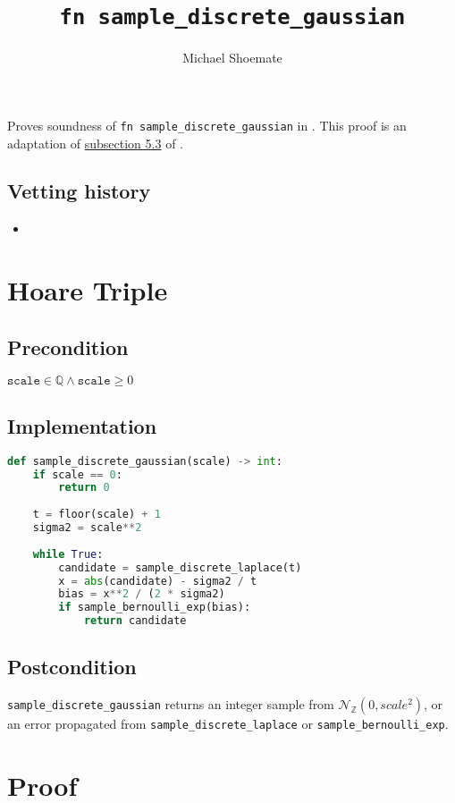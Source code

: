 \documentclass{article}
\title{\texttt{fn sample\_discrete\_gaussian}}
\author{Michael Shoemate}
\begin{document}
\maketitle

\contrib
Proves soundness of \texttt{fn sample\_discrete\_gaussian} in .
This proof is an adaptation of \href{https://arxiv.org/pdf/2004.00010.pdf#subsection.5.3}{subsection 5.3} of \cite{CKS20}.

\subsection*{Vetting history}
\begin{itemize}
    \item {}
\end{itemize}

\section{Hoare Triple}
\subsection*{Precondition}
$\texttt{scale} \in \mathbb{Q} \land \texttt{scale} \geq 0$

\subsection*{Implementation}        
\begin{lstlisting}[language=Python]
def sample_discrete_gaussian(scale) -> int:
    if scale == 0:
        return 0
    
    t = floor(scale) + 1
    sigma2 = scale**2
    
    while True:
        candidate = sample_discrete_laplace(t)
        x = abs(candidate) - sigma2 / t
        bias = x**2 / (2 * sigma2)
        if sample_bernoulli_exp(bias):
            return candidate
\end{lstlisting}

\subsection*{Postcondition}
\texttt{sample\_discrete\_gaussian} returns an integer sample from $\mathcal{N}_\mathbb{Z}(0, scale^2)$, or an error propagated from \texttt{sample\_discrete\_laplace} or \texttt{sample\_bernoulli\_exp}.

\section{Proof}
\end{document}
